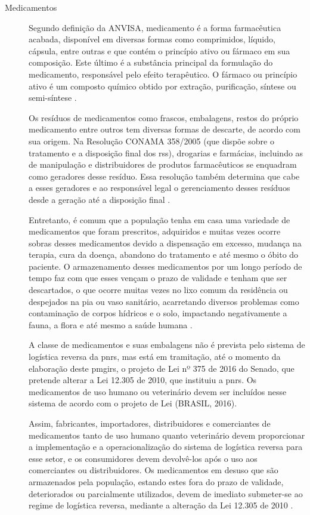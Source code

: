 \begin{description}
	\item[Medicamentos] Segundo definição da ANVISA, medicamento é a forma farmacêutica acabada, disponível em diversas formas como comprimidos, líquido, cápsula, entre outras e que contém o princípio ativo ou fármaco em sua composição. Este último é a substância principal da formulação do medicamento, responsável pelo efeito terapêutico. O fármaco ou princípio ativo é um composto químico obtido por extração, purificação, síntese ou semi-síntese \cite{anvisa2010}.

	Os resíduos de medicamentos como frascos, embalagens, restos do próprio medicamento entre outros tem diversas formas de descarte, de acordo com sua origem. Na Resolução CONAMA 358/2005 (que dispõe sobre o tratamento e a disposição final dos \gls{rss}), drogarias e farmácias, incluindo as de manipulação e distribuidores de produtos farmacêuticos se enquadram como geradores desse resíduo. Essa resolução também determina que cabe a esses geradores e ao responsável legal o gerenciamento desses resíduos desde a geração até a disposição final \cite{conama:358}.
	
	Entretanto, é comum que a população tenha em casa uma variedade de medicamentos que foram prescritos, adquiridos e muitas vezes ocorre sobras desses medicamentos devido a dispensação em excesso, mudança na terapia, cura da doença, abandono do tratamento e até mesmo o óbito do paciente. O armazenamento desses medicamentos por um longo período de tempo faz com que esses vençam o prazo de validade e tenham que ser descartados, o que ocorre muitas vezes no lixo comum da residência ou despejados na pia ou vaso sanitário, acarretando diversos problemas como contaminação de corpos hídricos e o solo, impactando negativamente a fauna, a flora e até mesmo a saúde humana \cite{Medeiros2014}.
	
	A classe de medicamentos e suas embalagens não é prevista pelo sistema de logística reversa da \gls{pnrs}, mas está em tramitação, até o momento da elaboração deste \gls{pmgirs}, o projeto de Lei nº 375 de 2016 do Senado, que pretende alterar a Lei 12.305 de 2010, que instituiu a \gls{pnrs}. Os medicamentos de uso humano ou veterinário devem ser incluídos nesse sistema de acordo com o projeto de Lei (BRASIL, 2016).
	
	Assim, fabricantes, importadores, distribuidores e comerciantes de medicamentos tanto de uso humano quanto veterinário devem proporcionar a implementação e a operacionalização do sistema de logística reversa para esse setor, e os consumidores devem devolvê-los após o uso aos comerciantes ou distribuidores. Os medicamentos em desuso que são armazenados pela população, estando estes fora do prazo de validade, deteriorados ou parcialmente utilizados, devem de imediato submeter-se ao regime de logística reversa, mediante a alteração da Lei 12.305 de 2010 \cite{brasil:12305}.
	

\end{description}
